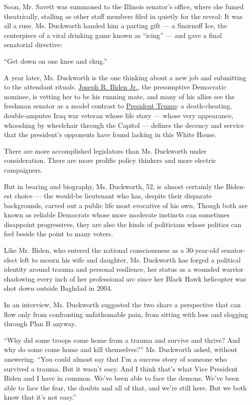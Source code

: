 Soon, Mr. Savett was summoned to the Illinois senator's office, where
she fumed theatrically, stalling as other staff members filed in quietly
for the reveal: It was all a ruse. Ms. Duckworth handed him a parting
gift --- a Smirnoff Ice, the centerpiece of a viral drinking game known
as ``icing'' --- and gave a final senatorial directive:

``Get down on one knee and chug.''

A year later, Ms. Duckworth is the one thinking about a new job and
submitting to the attendant rituals.
\href{https://www.nytimes.com/interactive/2020/us/elections/joe-biden.html}{Joseph
R. Biden Jr.}, the presumptive Democratic nominee, is vetting her to be
his running mate, and many of his allies see the freshman senator as a
model contrast to
\href{https://www.nytimes.com/interactive/2020/us/elections/donald-trump.html}{President
Trump}: a death-cheating, double-amputee Iraq war veteran whose life
story --- whose very appearance, whooshing by wheelchair through the
Capitol --- defines the decency and service that the president's
opponents have found lacking in this White House.

There are more accomplished legislators than Ms. Duckworth under
consideration. There are more prolific policy thinkers and more electric
campaigners.

But in bearing and biography, Ms. Duckworth, 52, is almost certainly the
Biden-est choice --- the would-be lieutenant who has, despite their
disparate backgrounds, carved out a public life most evocative of his
own. Though both are known as reliable Democrats whose more moderate
instincts can sometimes disappoint progressives, they are also the kinds
of politicians whose politics can feel beside the point to many voters.

Like Mr. Biden, who entered the national consciousness as a 30-year-old
senator-elect left to mourn his wife and daughter, Ms. Duckworth has
forged a political identity around trauma and personal resilience, her
status as a wounded warrior shadowing every inch of her professional arc
since her Black Hawk helicopter was shot down outside Baghdad in 2004.

In an interview, Ms. Duckworth suggested the two share a perspective
that can flow only from confronting unfathomable pain, from sitting with
loss and slogging through Plan B anyway.

``Why did some troops come home from a trauma and survive and thrive?
And why do some come home and kill themselves?'' Ms. Duckworth asked,
without answering. ``You could almost say that I'm a success story of
someone who survived a trauma. But it wasn't easy. And I think that's
what Vice President Biden and I have in common. We've been able to face
the demons. We've been able to face the fear, the doubts and all of
that, and we're still here. But we both know that it's not easy.''


